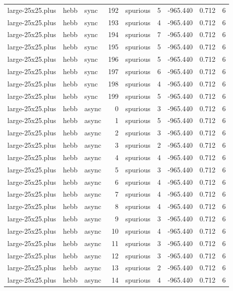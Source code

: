 \begin{tabular}{lllrlrrrr}
large-25x25.plus & hebb & sync & 192 & spurious & 5 & -965.440 & 0.712 & 6 \\
large-25x25.plus & hebb & sync & 193 & spurious & 4 & -965.440 & 0.712 & 6 \\
large-25x25.plus & hebb & sync & 194 & spurious & 7 & -965.440 & 0.712 & 6 \\
large-25x25.plus & hebb & sync & 195 & spurious & 5 & -965.440 & 0.712 & 6 \\
large-25x25.plus & hebb & sync & 196 & spurious & 5 & -965.440 & 0.712 & 6 \\
large-25x25.plus & hebb & sync & 197 & spurious & 6 & -965.440 & 0.712 & 6 \\
large-25x25.plus & hebb & sync & 198 & spurious & 4 & -965.440 & 0.712 & 6 \\
large-25x25.plus & hebb & sync & 199 & spurious & 5 & -965.440 & 0.712 & 6 \\
large-25x25.plus & hebb & async & 0 & spurious & 3 & -965.440 & 0.712 & 6 \\
large-25x25.plus & hebb & async & 1 & spurious & 5 & -965.440 & 0.712 & 6 \\
large-25x25.plus & hebb & async & 2 & spurious & 3 & -965.440 & 0.712 & 6 \\
large-25x25.plus & hebb & async & 3 & spurious & 2 & -965.440 & 0.712 & 6 \\
large-25x25.plus & hebb & async & 4 & spurious & 4 & -965.440 & 0.712 & 6 \\
large-25x25.plus & hebb & async & 5 & spurious & 3 & -965.440 & 0.712 & 6 \\
large-25x25.plus & hebb & async & 6 & spurious & 4 & -965.440 & 0.712 & 6 \\
large-25x25.plus & hebb & async & 7 & spurious & 4 & -965.440 & 0.712 & 6 \\
large-25x25.plus & hebb & async & 8 & spurious & 4 & -965.440 & 0.712 & 6 \\
large-25x25.plus & hebb & async & 9 & spurious & 3 & -965.440 & 0.712 & 6 \\
large-25x25.plus & hebb & async & 10 & spurious & 4 & -965.440 & 0.712 & 6 \\
large-25x25.plus & hebb & async & 11 & spurious & 3 & -965.440 & 0.712 & 6 \\
large-25x25.plus & hebb & async & 12 & spurious & 3 & -965.440 & 0.712 & 6 \\
large-25x25.plus & hebb & async & 13 & spurious & 2 & -965.440 & 0.712 & 6 \\
large-25x25.plus & hebb & async & 14 & spurious & 4 & -965.440 & 0.712 & 6 \\

\end{tabular}
